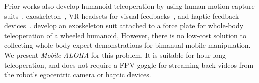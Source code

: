\documentclass[11pt, a4paper, logo, twocolumn]{stanford}
\newcommand{\method}{\textit{Mobile ALOHA} }
\begin{document}
Prior works also develop humanoid teleoperation by using human motion capture 
suits~\cite{darvish2019whole,dafarra2022icub3,cisneros2022team,dragan2013legibility}, 
exoskeleton~\cite{fang2023low,ishiguro2020bilateral,ramos2018humanoid,schwarz2021nimbro}, VR headsets for visual feedbacks~\cite{chagas2021humanoid,penco2019multimode,kim2013whole,tachi2020telesar}, and haptic feedback devices~\cite{brygo2014humanoid,peternel2013learning}. 
\citeauthor{purushottam2023dynamic} develop an exoskeleton suit attached to a force plate for whole-body teleoperation of a wheeled humanoid, 
However, there
is no low-cost solution to collecting whole-body expert demonstrations for bimanual mobile manipulation. We present \method for this problem. It is suitable for hour-long teleoperation, and does not require a FPV goggle for streaming back videos from the robot's egocentric camera or haptic devices. 
\end{document}
